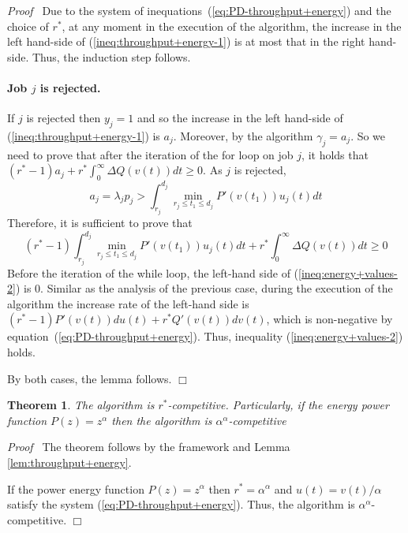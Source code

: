 \documentclass[11pt]{article}
\newenvironment{proof}{\noindent\emph{Proof\ }}{\hspace*{\fill}$\Box$\medskip}
\newtheorem{theorem}{Theorem}
\begin{document}
\begin{proof}
Due to the system of inequations~(\ref{eq:PD-throughput+energy}) and the choice of $r^{*}$, 
at any moment in the execution of the 
algorithm, the increase in the left hand-side of (\ref{ineq:throughput+energy-1}) is 
at most that in the right hand-side. Thus, the induction step follows.

\paragraph{Job $j$ is rejected.}
If $j$ is rejected then $y_{j} = 1$ and so the increase in the left hand-side of (\ref{ineq:throughput+energy-1}) 
is $a_{j}$. Moreover, by the algorithm $\gamma_{j} = a_{j}$.
So we need to prove that after the iteration of the for loop 
on job $j$, it holds that 
$(r^{*}-1) a_{j} + r^{*} \int_{0}^{\infty} \Delta Q(v(t)) dt \geq 0$.
As $j$ is rejected, 
$$
a_{j} = \lambda_{j}p_{j} > \int_{r_{j}}^{d_{j}} \min_{r_{j} \leq t_{1} \leq d_{j}} P'(v(t_{1})) u_{j}(t) dt
$$
Therefore, it is sufficient to prove that 
\begin{equation}	\label{ineq:energy+values-2}
(r^{*} - 1)\int_{r_{j}}^{d_{j}} \min_{r_{j} \leq t_{1} \leq d_{j}} P'(v(t_{1})) u_{j}(t) dt
+ r^{*} \int_{0}^{\infty} \Delta Q(v(t)) dt \geq 0
\end{equation}
Before the iteration of the while loop, the left-hand side of (\ref{ineq:energy+values-2}) 
is $0$. Similar as the analysis of the previous case, during the execution of the algorithm
the increase rate of the left-hand side is 
$(r^{*} - 1) P'(v(t)) du(t) + r^{*} Q'(v(t)) dv(t)$, which is non-negative by
equation~(\ref{eq:PD-throughput+energy}). Thus, inequality (\ref{ineq:energy+values-2})
holds.

By both cases, the lemma follows. 
\end{proof}

\begin{theorem}
The algorithm is $r^{*}$-competitive. Particularly,
if the energy power function $P(z) = z^{\alpha}$ then the algorithm 
is $\alpha^{\alpha}$-competitive
\end{theorem}
\begin{proof}
The theorem follows by the framework
and Lemma \ref{lem:throughput+energy}.

If the power energy function $P(z) = z^{\alpha}$ 
then $r^{*} = \alpha^{\alpha}$ and $u(t) = v(t)/\alpha$ satisfy the system 
(\ref{eq:PD-throughput+energy}). Thus, the algorithm is $\alpha^{\alpha}$-competitive.
\end{proof}
\end{document}
